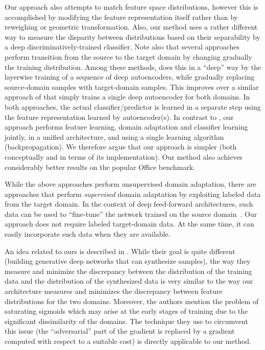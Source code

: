 \documentclass[twoside,11pt]{article}
\begin{document}
Our approach also attempts to match feature space distributions, however this is accomplished by modifying the feature representation itself rather than by reweighing or geometric transformation.
Also, our method uses a rather different way to measure the disparity between distributions based on their separability by a deep discriminatively-trained classifier. 
Note also that several approaches perform transition from the source to the target domain \citep{Gopalan11,Gong12} by changing gradually the training distribution. Among these methods, \citet{Chopra13} does this in a ``deep'' way by the layerwise training of a sequence of deep autoencoders, while gradually replacing source-domain samples with target-domain samples. This improves over a similar approach of \citet{Glorot11} that simply trains a single deep autoencoder for both domains. In both approaches, the actual classifier/predictor is learned in a separate step using the feature representation learned by autoencoder(s). In contrast to \citet{Glorot11,Chopra13}, our approach performs feature learning, domain adaptation and classifier learning jointly, in a unified architecture, and using a single learning algorithm (backpropagation). We therefore argue that our approach is simpler (both conceptually and in terms of its implementation). Our method also achieves considerably better results on the popular {\sc Office} benchmark.

While the above approaches perform unsupervised domain adaptation, there are approaches that perform {\em supervised} domain adaptation by exploiting labeled data from the target domain. In the context of deep feed-forward architectures, such data can be used to ``fine-tune'' the network trained on the source domain~\citep{Zeiler13,Oquab14,Babenko14}. Our approach does not require labeled target-domain data. At the same time, it can easily incorporate such data when they are available.

An idea related to ours is described in \citet{Goodfellow14}. While their goal is quite different (building generative deep networks that can synthesize samples), the way they measure and minimize the discrepancy between the distribution of the training data and the distribution of the synthesized data is very similar to the way our architecture measures and minimizes the discrepancy between feature distributions for the two domains. Moreover, the authors mention the problem  of saturating sigmoids which may arise at the early stages of training due to the significant dissimilarity of the domains. The technique they use to circumvent this issue (the ``adversarial'' part of the gradient is replaced by a gradient computed with respect to a suitable cost) is directly applicable to our method. 
\end{document}
